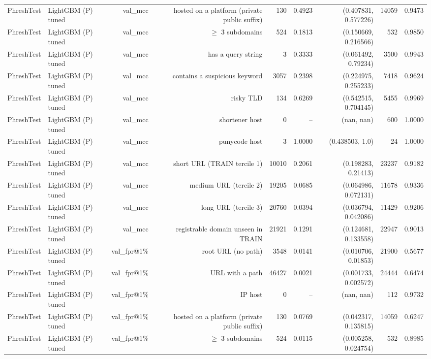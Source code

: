 \begin{table}[t]
\begin{tabular}{llrrrrrrr}
PhreshTest & LightGBM (P) tuned & val\_mcc & hosted on a platform (private public suffix) & 130 & 0.4923 & (0.407831, 0.577226) & 14059 & 0.9473 \\
PhreshTest & LightGBM (P) tuned & val\_mcc & $\geq$ 3 subdomains & 524 & 0.1813 & (0.150669, 0.216566) & 532 & 0.9850 \\
PhreshTest & LightGBM (P) tuned & val\_mcc & has a query string & 3 & 0.3333 & (0.061492, 0.79234) & 3500 & 0.9943 \\
PhreshTest & LightGBM (P) tuned & val\_mcc & contains a suspicious keyword & 3057 & 0.2398 & (0.224975, 0.255233) & 7418 & 0.9624 \\
PhreshTest & LightGBM (P) tuned & val\_mcc & risky TLD & 134 & 0.6269 & (0.542515, 0.704145) & 5455 & 0.9969 \\
PhreshTest & LightGBM (P) tuned & val\_mcc & shortener host & 0 & -- & (nan, nan) & 600 & 1.0000 \\
PhreshTest & LightGBM (P) tuned & val\_mcc & punycode host & 3 & 1.0000 & (0.438503, 1.0) & 24 & 1.0000 \\
PhreshTest & LightGBM (P) tuned & val\_mcc & short URL (TRAIN tercile 1) & 10010 & 0.2061 & (0.198283, 0.21413) & 23237 & 0.9182 \\
PhreshTest & LightGBM (P) tuned & val\_mcc & medium URL (tercile 2) & 19205 & 0.0685 & (0.064986, 0.072131) & 11678 & 0.9336 \\
PhreshTest & LightGBM (P) tuned & val\_mcc & long URL (tercile 3) & 20760 & 0.0394 & (0.036794, 0.042086) & 11429 & 0.9206 \\
PhreshTest & LightGBM (P) tuned & val\_mcc & registrable domain unseen in TRAIN & 21921 & 0.1291 & (0.124681, 0.133558) & 22947 & 0.9013 \\
PhreshTest & LightGBM (P) tuned & val\_fpr@1\% & root URL (no path) & 3548 & 0.0141 & (0.010706, 0.01853) & 21900 & 0.5677 \\
PhreshTest & LightGBM (P) tuned & val\_fpr@1\% & URL with a path & 46427 & 0.0021 & (0.001733, 0.002572) & 24444 & 0.6474 \\
PhreshTest & LightGBM (P) tuned & val\_fpr@1\% & IP host & 0 & -- & (nan, nan) & 112 & 0.9732 \\
PhreshTest & LightGBM (P) tuned & val\_fpr@1\% & hosted on a platform (private public suffix) & 130 & 0.0769 & (0.042317, 0.135815) & 14059 & 0.6247 \\
PhreshTest & LightGBM (P) tuned & val\_fpr@1\% & $\geq$ 3 subdomains & 524 & 0.0115 & (0.005258, 0.024754) & 532 & 0.8985 \\

\end{tabular}
\end{table}
